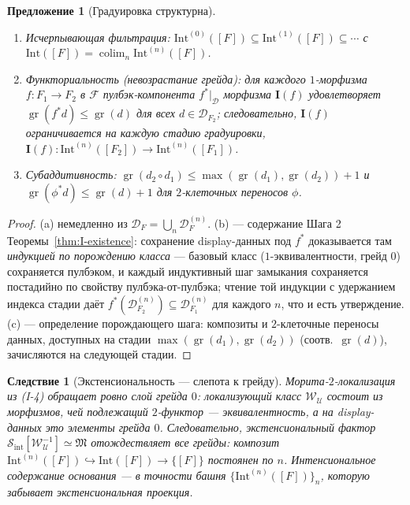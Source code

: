 \documentclass[11pt]{article}
\theoremstyle{plain}
\newtheorem{proposition}[theorem]{Предложение}
\newtheorem{corollary}[theorem]{Следствие}
\theoremstyle{definition}
\newcommand{\cS}{\mathcal{S}}
\newcommand{\cF}{\mathcal{F}}
\newcommand{\cD}{\mathcal{D}}
\newcommand{\fM}{\mathfrak{M}}
\newcommand{\Sint}{\cS_{\mathrm{int}}}
\newcommand{\II}{\mathbf{I}}
\newcommand{\cU}{\mathcal{U}}
\DeclareMathOperator{\colim}{colim}
\newcommand{\gr}{\operatorname{gr}}
\begin{document}
\begin{proposition}[Градуировка структурна]\label{prop:grading}
\begin{enumerate}[label=(\alph*)]
\item \emph{Исчерпывающая фильтрация}: $\mathrm{Int}^{(0)}([F]) \subseteq \mathrm{Int}^{(1)}([F]) \subseteq \cdots$ с $\mathrm{Int}([F]) = \colim_{n} \mathrm{Int}^{(n)}([F])$.
\item \emph{Функториальность (невозрастание грейда)}: для каждого $1$-морфизма $f : F_1 \to F_2$ в $\cF$ пулбэк-компонента $f^*|_{\cD}$ морфизма $\II(f)$ удовлетворяет $\gr(f^* d) \leq \gr(d)$ для всех $d \in \cD_{F_2}$; следовательно, $\II(f)$ ограничивается на каждую стадию градуировки, $\II(f) : \mathrm{Int}^{(n)}([F_2]) \to \mathrm{Int}^{(n)}([F_1])$.
\item \emph{Субаддитивность}: $\gr(d_2 \circ d_1) \leq \max(\gr(d_1), \gr(d_2)) + 1$ и $\gr(\phi^* d) \leq \gr(d) + 1$ для $2$-клеточных переносов $\phi$.
\end{enumerate}
\end{proposition}

\begin{proof}
(a) немедленно из $\cD_F = \bigcup_n \cD_F^{(n)}$. (b) — содержание Шага 2 Теоремы~\ref{thm:I-existence}: сохранение display-данных под $f^*$ доказывается там \emph{индукцией по порождению класса} --- базовый класс ($1$-эквивалентности, грейд $0$) сохраняется пулбэком, и каждый индуктивный шаг замыкания сохраняется постадийно по свойству пулбэка-от-пулбэка; чтение той индукции с удержанием индекса стадии даёт $f^*(\cD_{F_2}^{(n)}) \subseteq \cD_{F_1}^{(n)}$ для каждого $n$, что и есть утверждение. (c) — определение порождающего шага: композиты и $2$-клеточные переносы данных, доступных на стадии $\max(\gr(d_1), \gr(d_2))$ (соотв.\ $\gr(d)$), зачисляются на следующей стадии.
\end{proof}

\begin{corollary}[Экстенсиональность — слепота к грейду]\label{cor:grade-collapse}
Морита-$2$-локализация из (I-4) обращает ровно слой грейда $0$: локализующий класс $\mathcal{W}_\cU$ состоит из морфизмов, чей подлежащий $2$-функтор — эквивалентность, а на display-данных это элементы грейда $0$. Следовательно, экстенсиональный фактор $\Sint[\mathcal{W}_\cU^{-1}] \simeq \fM$ отождествляет все грейды: композит $\mathrm{Int}^{(n)}([F]) \hookrightarrow \mathrm{Int}([F]) \to \{[F]\}$ постоянен по $n$. Интенсиональное содержание основания — в точности башня $\{\mathrm{Int}^{(n)}([F])\}_{n}$, которую забывает экстенсиональная проекция.
\end{corollary}
\end{document}
